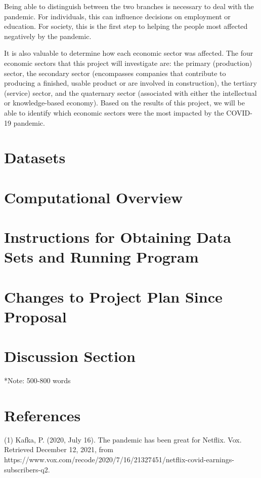 \documentclass[fontsize=11pt]{article}
\begin{document}
Being able to distinguish between the two branches is necessary to deal with the pandemic. For individuals, this can influence decisions on employment or education. For society,  this is the first step to helping the people most affected negatively by the pandemic.

It is also valuable to determine how each economic sector was affected. The four economic sectors that this project will investigate are: the primary (production) sector, the secondary sector (encompasses companies that contribute to producing a finished, usable product or are involved in construction), the tertiary (service) sector, and the quaternary sector (associated with either the intellectual or knowledge-based economy). Based on the results of this project, we will be able to identify which economic sectors were the most impacted by the COVID-19 pandemic.  

\section{Datasets}

\section{Computational Overview }



\section{Instructions for Obtaining Data Sets and Running Program}

\section{Changes to Project Plan Since Proposal}

\section{Discussion Section}
*Note: 500-800 words

\section{References}

(1) Kafka, P. (2020, July 16). The pandemic has been great for Netflix. Vox. Retrieved December 12, 2021, from https://www.vox.com/recode/2020/7/16/21327451/netflix-covid-earnings-subscribers-q2. 
\end{document}
